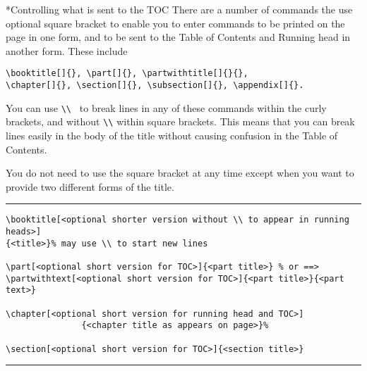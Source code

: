 \documentclass{kapproc} %
\makeatletter
\newif\ifdotoc
\def\numberline#1{}
\newif\ifdoctitle
\def\ysection#1{\ifdotoc
\addcontentsline{toc}{section}{\protect\numberline{x}#1}\fi
{\let\uppercase\relax
\@startsection {section}{3}{-24pt}{-36pt plus -1pt minus 
 -1pt}{1sp}{\Large\bf}*{#1}}}
\def\section{\ysection}
\def\ysubsection#1#2{{\let\uppercase\relax%
\@startsection {subsection}{2}{-12pt}{-24pt plus -1pt minus 
 -1pt}{1sp}{\large\sc}#1{#2}}}
\def\subsection{\ysubsection*}
\def\chapter#1{\global\doctitletrue
\vbox to  9.5pc{
\hyphenpenalty=10000 %
\parindent=-36pt
\vskip12pt\vskip-\parskip
\def\\ {\vskip-\parskip}
\booktitlefont\baselineskip=30pt
#1
\vskip1sp %
\moveright-36pt\vbox{\advance\hsize by 36pt
\hrule height 1.5pt  width \hsize
}\vfill}}
\makeatother
\begin{document}
\section{Controlling what is sent to the TOC}
There are a number of commands the use optional square bracket to
enable you to enter commands to be printed on the page in one 
form, and to be sent to the Table of Contents and Running head
in another form. These include
\vskip-6pt
\vskip1sp
\begin{verbatim}
\booktitle[]{}, \part[]{}, \partwithtitle[]{}{}, 
\chapter[]{}, \section[]{}, \subsection[]{}, \appendix[]{}.
\end{verbatim}
You can use
\verb+\\ + to break lines in any of these commands within the
curly brackets, and without \verb+\\+ within square brackets.
This means that you can break lines easily in the body of the
title without causing confusion in the Table of Contents.

You do not need to use the square bracket at any time except when
you want to provide two different forms of the title.
\vskip6pt
{\baselineskip=9pt
\hrule
\vskip-6pt
\vskip1sp
\begin{verbatim}
\booktitle[<optional shorter version without \\ to appear in running heads>]
{<title>}% may use \\ to start new lines

\part[<optional short version for TOC>]{<part title>} % or ==>
\partwithtext[<optional short version for TOC>]{<part title>}{<part text>}

\chapter[<optional short version for running head and TOC>]
               {<chapter title as appears on page>}%

\section[<optional short version for TOC>]{<section title>}
\end{verbatim}}
\hrule
\vskip-24pt
\vskip1sp
\end{document}
